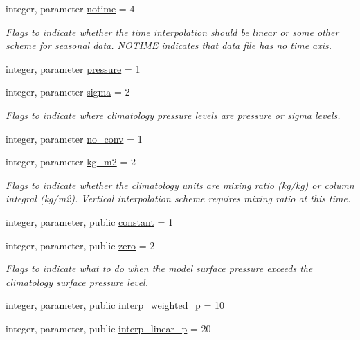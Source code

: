 \begin{DoxyCompactItemize}
\item 
integer, parameter \hyperlink{namespaceinterpolator__mod_a88b6fdd8d37ba85e09ff1f5a9b2d07ab}{notime} = 4
\begin{DoxyCompactList}\small\item\em Flags to indicate whether the time interpolation should be linear or some other scheme for seasonal data. N\+O\+T\+I\+ME indicates that data file has no time axis. \end{DoxyCompactList}\item 
integer, parameter \hyperlink{namespaceinterpolator__mod_a0fd9465334bb2c39bcc5090ab821d0b3}{pressure} = 1
\item 
integer, parameter \hyperlink{namespaceinterpolator__mod_a621aafe73fb97a0187230316cd5c4ac5}{sigma} = 2
\begin{DoxyCompactList}\small\item\em Flags to indicate where climatology pressure levels are pressure or sigma levels. \end{DoxyCompactList}\item 
integer, parameter \hyperlink{namespaceinterpolator__mod_a40a1ac7ecc3a790262fa82f59179a0e1}{no\+\_\+conv} = 1
\item 
integer, parameter \hyperlink{namespaceinterpolator__mod_a6a62074fd8f0b8b897a7c96fa9d93c30}{kg\+\_\+m2} = 2
\begin{DoxyCompactList}\small\item\em Flags to indicate whether the climatology units are mixing ratio (kg/kg) or column integral (kg/m2). Vertical interpolation scheme requires mixing ratio at this time. \end{DoxyCompactList}\item 
integer, parameter, public \hyperlink{namespaceinterpolator__mod_af3aa87fa602fb4a19b39e27cd19fa99a}{constant} = 1
\item 
integer, parameter, public \hyperlink{namespaceinterpolator__mod_a4a4f1f5ef4024f3705d0560213d4e6fb}{zero} = 2
\begin{DoxyCompactList}\small\item\em Flags to indicate what to do when the model surface pressure exceeds the climatology surface pressure level. \end{DoxyCompactList}\item 
integer, parameter, public \hyperlink{namespaceinterpolator__mod_aa0f19074ff527b11830b0efe795e55c2}{interp\+\_\+weighted\+\_\+p} = 10
\item 
integer, parameter, public \hyperlink{namespaceinterpolator__mod_a80a3b9259000c57c6bea011f7fdd8fe2}{interp\+\_\+linear\+\_\+p} = 20

\end{DoxyCompactItemize}
